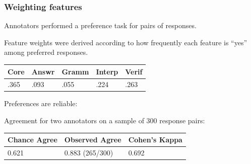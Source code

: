 \documentclass[handout,xcolor={dvipsnames}]{beamer}
\begin{document}
\begin{frame}
\frametitle{Weighting features}

\vspace{1em}

Annotators performed a preference task for pairs of responses. \\

\vspace{.7em}

Feature weights were derived according to how frequently each feature is ``yes'' among preferred responses. \\

\vspace{1em}

\begin{table}[htb!]
\begin{center}
\begin{tabular}{|l|l|l|l|l|}
\hline
Core & Answr & Gramm & Interp & Verif \\
\hline
.365 & .093 & .055 & .224 & .263 \\
\hline
\end{tabular}
\end{center}
\end{table}

\vspace{1em}

Preferences are reliable:

\vspace{1em}

Agreement for two annotators on a sample of 300 response pairs:

\vspace{1em}

\begin{table}[htb!]
\begin{center}
\begin{tabular}{|l|l|l|}
\hline
 Chance Agree & Observed Agree & Cohen's Kappa \\
\hline
0.621 & 0.883 (265/300) & 0.692 \\
\hline
\end{tabular}
\end{center}
\end{table}

\end{frame}
\end{document}
